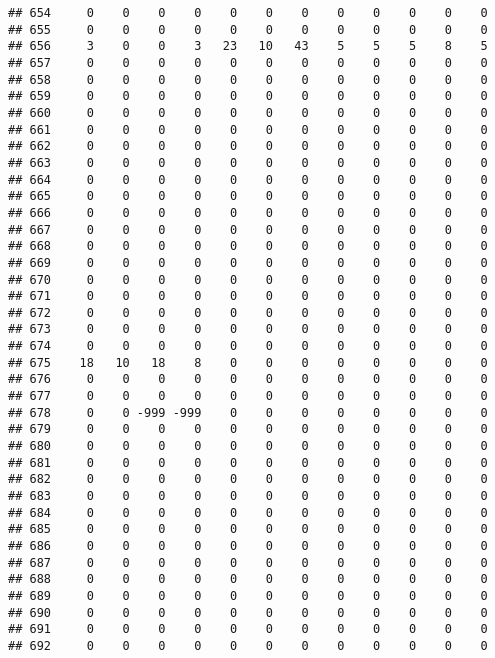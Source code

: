 \documentclass[]{article}
\begin{document}
\begin{verbatim}
## 654     0    0    0    0    0    0    0    0    0    0    0    0
## 655     0    0    0    0    0    0    0    0    0    0    0    0
## 656     3    0    0    3   23   10   43    5    5    5    8    5
## 657     0    0    0    0    0    0    0    0    0    0    0    0
## 658     0    0    0    0    0    0    0    0    0    0    0    0
## 659     0    0    0    0    0    0    0    0    0    0    0    0
## 660     0    0    0    0    0    0    0    0    0    0    0    0
## 661     0    0    0    0    0    0    0    0    0    0    0    0
## 662     0    0    0    0    0    0    0    0    0    0    0    0
## 663     0    0    0    0    0    0    0    0    0    0    0    0
## 664     0    0    0    0    0    0    0    0    0    0    0    0
## 665     0    0    0    0    0    0    0    0    0    0    0    0
## 666     0    0    0    0    0    0    0    0    0    0    0    0
## 667     0    0    0    0    0    0    0    0    0    0    0    0
## 668     0    0    0    0    0    0    0    0    0    0    0    0
## 669     0    0    0    0    0    0    0    0    0    0    0    0
## 670     0    0    0    0    0    0    0    0    0    0    0    0
## 671     0    0    0    0    0    0    0    0    0    0    0    0
## 672     0    0    0    0    0    0    0    0    0    0    0    0
## 673     0    0    0    0    0    0    0    0    0    0    0    0
## 674     0    0    0    0    0    0    0    0    0    0    0    0
## 675    18   10   18    8    0    0    0    0    0    0    0    0
## 676     0    0    0    0    0    0    0    0    0    0    0    0
## 677     0    0    0    0    0    0    0    0    0    0    0    0
## 678     0    0 -999 -999    0    0    0    0    0    0    0    0
## 679     0    0    0    0    0    0    0    0    0    0    0    0
## 680     0    0    0    0    0    0    0    0    0    0    0    0
## 681     0    0    0    0    0    0    0    0    0    0    0    0
## 682     0    0    0    0    0    0    0    0    0    0    0    0
## 683     0    0    0    0    0    0    0    0    0    0    0    0
## 684     0    0    0    0    0    0    0    0    0    0    0    0
## 685     0    0    0    0    0    0    0    0    0    0    0    0
## 686     0    0    0    0    0    0    0    0    0    0    0    0
## 687     0    0    0    0    0    0    0    0    0    0    0    0
## 688     0    0    0    0    0    0    0    0    0    0    0    0
## 689     0    0    0    0    0    0    0    0    0    0    0    0
## 690     0    0    0    0    0    0    0    0    0    0    0    0
## 691     0    0    0    0    0    0    0    0    0    0    0    0
## 692     0    0    0    0    0    0    0    0    0    0    0    0

\end{verbatim}
\end{document}
